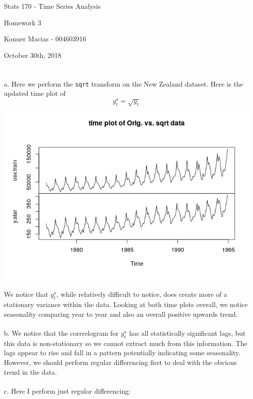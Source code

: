 \documentclass[11pt]{article}
\begin{document}
\centerline{\Large Stats 170 - Time Series Analysis}
\vspace{3pc}
\centerline{\Large Homework 3}
\vspace{.5pc}
\centerline{Konner Macias - 004603916}
\centerline{October 30th, 2018}
\vspace{1.5pc}
\section{}
a. Here we perform the {\tt sqrt} transform on the New Zealand dataset. Here is the updated time plot of 
$$ y_t^\star = \sqrt{y_t} $$
\begin{center}
\includegraphics[scale=1]{1a}
\end{center}
We notice that $y_t^\star$, while relatively difficult to notice, does create more of a stationary variance within the data. Looking at both time plots overall, we notice seasonality comparing year to year and also an overall positive upwards trend.
\\\\
b. We notice that the corrrelogram for $y_t^\star$ has all statistically significant lags, but this data is non-stationary so we cannot extract much from this information. The lags appear to rise and fall in a pattern potentially indicating some seasonality. However, we should perform regular differencing first to deal with the obvious trend in the data.
\\\\
c. Here I perform just regular differencing:
\end{document}
